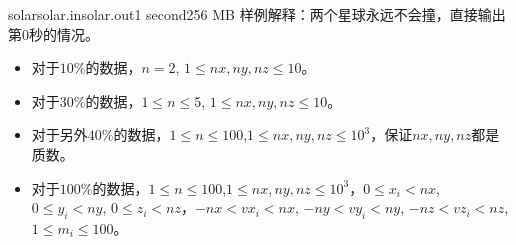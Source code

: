 \documentclass[11pt,a4paper,oneside]{article}
\begin{document}
\begin{problem}{solar}{solar.in}{solar.out}{1 second}{256 MB}
	样例解释：两个星球永远不会撞，直接输出第$0$秒的情况。
	
    \Note
    \begin{itemize}
		\item 对于$10\%$的数据，$n = 2$, $1 \leq nx, ny, nz \leq 10$。
		\item 对于$30\%$的数据，$1 \leq n \leq 5$, $1 \leq nx, ny, nz \leq 10$。
		\item 对于另外$40\%$的数据，$1 \leq n \leq 100$,$1 \leq nx, ny, nz \leq 10^3$，保证$nx,ny,nz$都是质数。
		\item 对于$100\%$的数据，$1 \leq n \leq 100$,$1 \leq nx, ny, nz \leq 10^3$，$0 \leq x_i < nx$, $0 \leq y_i < ny$, $0 \leq z_i < nz$，$-nx < vx_i < nx$, $-ny < vy_i < ny$, $-nz < vz_i < nz$, $1 \leq m_i \leq 100$。
    \end{itemize}

\end{problem}
\end{document}
